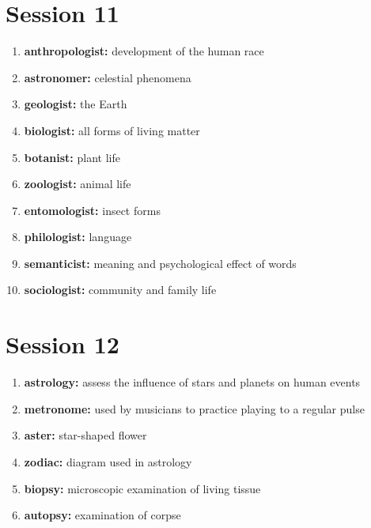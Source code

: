 \documentclass{article}
\begin{document}
\section{Session 11}
\begin{enumerate}
    \item \textbf{anthropologist: }{development of the human race}
    \item \textbf{astronomer: }{celestial phenomena}
    \item \textbf{geologist: }{the Earth}
    \item \textbf{biologist: }{all forms of living matter}
    \item \textbf{botanist: }{plant life}
    \item \textbf{zoologist: }{animal life}
    \item \textbf{entomologist: }{insect forms}
    \item \textbf{philologist: }{language}
    \item \textbf{semanticist: }{meaning and psychological effect of words}
    \item \textbf{sociologist: }{community and family life}
    
\end{enumerate}

\section{Session 12}
\begin{enumerate}
    \item \textbf{astrology: }{assess the influence of stars and planets on human events}
    \item \textbf{metronome: }{used by musicians to practice playing to a regular pulse}
    \item \textbf{aster: }{star-shaped flower}
    \item \textbf{zodiac: }{diagram used in astrology}
    \item \textbf{biopsy: }{microscopic examination of living tissue}
    \item \textbf{autopsy: }{examination of corpse}
    
\end{enumerate}
\end{document}
